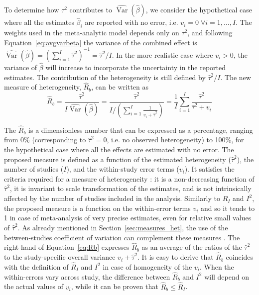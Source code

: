 \documentclass[11pt,a4paper,twoside,openany]{book}\usepackage{knitr}
\DeclareMathOperator{\Var}{Var}
\begin{document}
{{To determine how $\tau^2$ contributes to $\widehat{\Var} \left(\hat \beta \right)$, we consider the hypothetical case where all the estimates $\hat \beta_i$ are reported with no error, i.e. $v_i = 0 \; \forall i = 1, \dots, I$. The weights used in the meta-analytic model depends only on $\tau^2$, and following Equation~\ref{eq:avgvarbeta} the variance of the combined effect is $\widehat{\Var} \left(\hat \beta \right) = \left(\sum_{i = 1}^I \hat \tau^2 \right)^{-1} = \hat \tau^2/I$.
In the more realistic case where $v_i > 0$, the variance of $\hat \beta$ will increase to incorporate the uncertainty in the reported estimates. The contribution of the heterogeneity is still defined by $\hat \tau^2/I$. The new measure of heterogeneity, $\hat R_b$, can be written as
\begin{equation}
\hat R_b = \frac{\hat \tau^2}{I \widehat{\Var} \left(\hat \beta \right)} = \frac{\hat \tau^2}{I/\left( \sum_{i = 1}^I \frac{1}{v_i + \hat \tau^2} \right)} = \frac{1}{I}\sum_{i = 1}^I \frac{\hat \tau^2}{\hat \tau^2 + v_i}
\label{eq:Rb}
\end{equation}

\noindent The $\hat R_b$ is a dimensionless number that can be expressed as a percentage, ranging from 0\% (corresponding to $\hat \tau^2 = 0$, i.e. no observed heterogeneity) to 100\%, for the hypothetical case where all the effects are estimated with no error. The proposed measure is defined as a function of the estimated heterogeneity ($\hat \tau^2$), the number of studies ($I$), and the within-study error terms ($v_i$). It satisfies the criteria required for a measure of heterogeneity \citep{higgins2002quantifying}: it is a non-decreasing function of $\hat \tau^2$, it is invariant to scale transformation of the estimates, and is not intrinsically affected by the number of studies included in the analysis. Similarly to $\hat R_I$ and $I^2$, the proposed measure is a function on the within-error terms $v_i$ and so it tends to 1 in case of meta-analysis of very precise estimates, even for relative small values of $\hat \tau^2$. As already mentioned in Section~\ref{sec:measures_het}, the use of the between-studies coefficient of variation can complement these measures \citep{takkouche1999evaluation}.
The right hand of Equation~\ref{eq:Rb} expresses $\hat R_b$ as an average of the ratios of the $\hat \tau^2$ to the study-specific overall variance $v_i + \hat \tau^2$. It is easy to derive that $\hat R_b$ coincides with the definition of $\hat R_I$ and $I^2$ in case of homogeneity of the $v_i$. When the within-errors vary across study, the difference between $\hat R_b$ and $I^2$ will depend on the actual values of $v_i$, while it can be proven that $\hat R_b \le \hat R_I$.

}}
\end{document}
